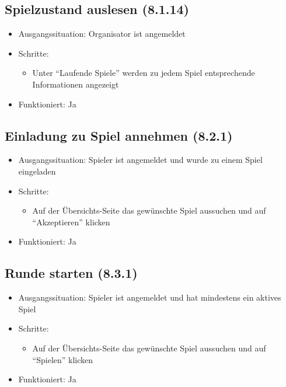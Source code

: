 \documentclass[a4paper]{scrreprt}
\begin{document}
            \subsection{Spielzustand auslesen (8.1.14)}
            \begin{itemize}
                \item Ausgangssituation: Organisator ist angemeldet
                \item Schritte:
                    \begin{itemize}
                        \item Unter \enquote{Laufende Spiele} werden zu jedem Spiel entsprechende Informationen angezeigt
                    \end{itemize}
                \item Funktioniert: Ja
            \end{itemize}

            \subsection{Einladung zu Spiel annehmen (8.2.1)}
            \begin{itemize}
                \item Ausgangssituation: Spieler ist angemeldet und wurde zu einem Spiel eingeladen
                \item Schritte:
                    \begin{itemize}
                        \item Auf der Übersichts-Seite das gewünschte Spiel aussuchen und auf \enquote{Akzeptieren} klicken
                    \end{itemize}
                \item Funktioniert: Ja
            \end{itemize}

            \subsection{Runde starten (8.3.1)}
            \begin{itemize}
                \item Ausgangssituation: Spieler ist angemeldet und hat mindestens ein aktives Spiel
                \item Schritte:
                    \begin{itemize}
                        \item Auf der Übersichts-Seite das gewünschte Spiel aussuchen und auf \enquote{Spielen} klicken
                    \end{itemize}
                \item Funktioniert: Ja
            \end{itemize}
\end{document}
